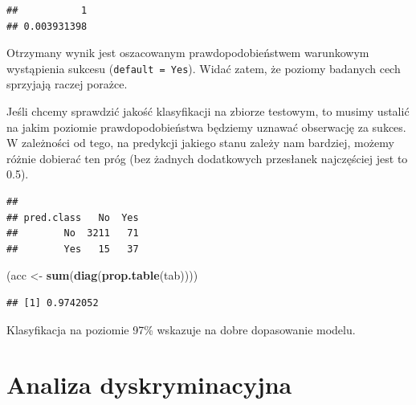 \documentclass[
]{book}
\newenvironment{Shaded}{\begin{snugshade}}{\end{snugshade}}
\newcommand{\DataTypeTok}[1]{\textcolor[rgb]{0.13,0.29,0.53}{#1}}
\newcommand{\FloatTok}[1]{\textcolor[rgb]{0.00,0.00,0.81}{#1}}
\newcommand{\KeywordTok}[1]{\textcolor[rgb]{0.13,0.29,0.53}{\textbf{#1}}}
\newcommand{\NormalTok}[1]{#1}
\newcommand{\OperatorTok}[1]{\textcolor[rgb]{0.81,0.36,0.00}{\textbf{#1}}}
\newcommand{\StringTok}[1]{\textcolor[rgb]{0.31,0.60,0.02}{#1}}
\theoremstyle{plain}
\theoremstyle{definition}
\theoremstyle{definition}
\theoremstyle{definition}
\theoremstyle{definition}
\theoremstyle{remark}
\begin{document}
\begin{verbatim}
##           1 
## 0.003931398
\end{verbatim}

Otrzymany wynik jest oszacowanym prawdopodobieństwem warunkowym wystąpienia sukcesu (\texttt{default\ =\ Yes}). Widać zatem, że poziomy badanych cech sprzyjają raczej porażce.

Jeśli chcemy sprawdzić jakość klasyfikacji na zbiorze testowym, to musimy ustalić na jakim poziomie prawdopodobieństwa będziemy uznawać obserwację za sukces. W zależności od tego, na predykcji jakiego stanu zależy nam bardziej, możemy różnie dobierać ten próg (bez żadnych dodatkowych przesłanek najczęściej jest to 0.5).

\begin{Shaded}
\end{Shaded}

\begin{verbatim}
##           
## pred.class   No  Yes
##        No  3211   71
##        Yes   15   37
\end{verbatim}

\begin{Shaded}
\begin{Highlighting}[]
\NormalTok{(acc <-}\StringTok{ }\KeywordTok{sum}\NormalTok{(}\KeywordTok{diag}\NormalTok{(}\KeywordTok{prop.table}\NormalTok{(tab))))}
\end{Highlighting}
\end{Shaded}

\begin{verbatim}
## [1] 0.9742052
\end{verbatim}

Klasyfikacja na poziomie 97\% wskazuje na dobre dopasowanie modelu.

\hypertarget{LDA}{%
\chapter{Analiza dyskryminacyjna}\label{LDA}}
\end{document}
